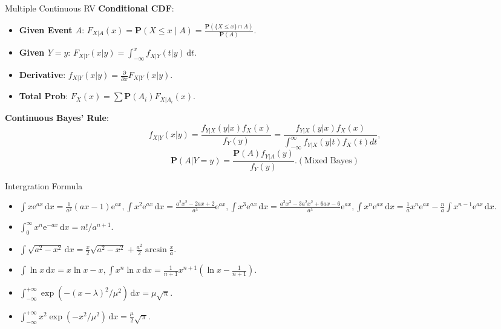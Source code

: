 \documentclass[landscape,a4paper]{article}
\newcommand{\e}{\mathrm{e}}
\newcommand{\PP}{\mathbf{P}}
\begin{document}
\begin{multicols*}{4}
\begin{card}{Multiple Continuous RV}
			\textbf{Conditional CDF}: 
			\begin{itemize}
				\item \textbf{Given Event $A$}: $F_{X|A}(x) = \PP(X \le x \mid A) = \frac{\PP(\{X \le x\} \cap A)}{\PP(A)}$.
				\item \textbf{Given $Y=y$}: $F_{X|Y}(x|y) = \int_{-\infty}^{x} f_{X|Y}(t|y) \,\mathrm dt$.
				\item \textbf{Derivative}: $f_{X|Y}(x|y) = \frac{\partial}{\partial x} F_{X|Y}(x|y)$.
				\item \textbf{Total Prob}: $F_X(x) = \sum \PP(A_i) F_{X|A_i}(x)$.
			\end{itemize}
			\textbf{Continuous Bayes' Rule}:
			\[
			f_{X | Y}(x | y)=\frac{f_{Y | X}(y | x) f_X(x)}{f_Y(y)}=\frac{f_{Y | X}(y | x) f_X(x)}{\int_{-\infty}^{\infty} f_{Y | X}(y | t) f_X(t) d t},
			\]
			\[\PP(A|Y=y) = \frac{\PP(A) f_{Y|A}(y)}{f_Y(y)}. (\text{Mixed Bayes})\]
		\end{card}
		\begin{card}{Intergration Formula}
			\begin{itemize}
				\item $\int x\e^{ax}\,\mathrm dx=\frac{1}{a^2}(ax-1)\e^{ax},\int x^2\e^{ax}\,\mathrm dx=\frac{a^2x^2-2ax+2}{a^3}\e^{ax},\int x^3\e^{ax}\,\mathrm dx=\frac{a^3x^3-3a^2x^2+6ax-6}{a^3}\e^{ax},\int x^n\e^{ax}\,\mathrm dx=\frac{1}{a}x^n\e^{ax}-\frac{n}{a}\int x^{n-1}\e^{ax}\,\mathrm dx.$
				\item $\int_0^{\infty}x^n\e^{-ax}\,\mathrm dx=n!/a^{n+1}.$
				\item $\int\sqrt{a^2-x^2}\,\mathrm dx=\frac{x}{2}\sqrt{a^2-x^2}+\frac{a^2}{2}\arcsin\frac{x}{a}.$
				\item $\int \ln x\,\mathrm dx=x\ln x-x,\int x^n\ln x\,\mathrm dx=\frac{1}{n+1}x^{n+1}\left(\ln x-\frac{1}{n+1}\right).$
				\item $\int_{-\infty}^{+\infty} \exp\left(-(x-\lambda)^2/\mu^2\right)\,\mathrm dx=\mu\sqrt{\uppi}$.
				\item $\int_{-\infty}^{+\infty}x^2\exp\left(-x^2/\mu^2\right)\,\mathrm dx=\frac{\mu}{2}\sqrt{\uppi}.$
			\end{itemize}
		\end{card}
	\end{multicols*}
\end{document}
